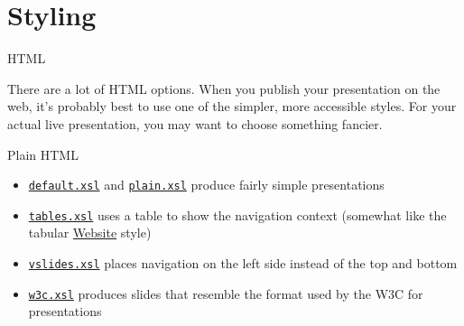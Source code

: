 \documentclass[pdf,frames,slideColor, rcas]{prosper}
\begin{document}
\part{Styling            }
\label{id2719315}


\begin{slide}{HTML}
\label{id2719325}

There are a lot of HTML options. When you publish your
presentation on the web, it's probably best to use one of the simpler,
more accessible styles. For your actual live presentation, you may
want to choose something fancier.
\end{slide}

\begin{slide}{Plain HTML}
\label{id2719340}
\begin{itemize}

	\item 
\href{../default/}{{\tt{default.xsl}}}
and
\href{../plain/}{{\tt{plain.xsl}}}
produce fairly simple presentations



	\item 
\href{../tables/}{{\tt{tables.xsl}}}
uses a table to show the navigation context (somewhat like the tabular
\href{http://docbook.sourceforge.net/}{Website} style)



	\item 
\href{../vslides/}{{\tt{vslides.xsl}}}
places navigation on the left side instead of the top and bottom



	\item 
\href{../w3c/}{{\tt{w3c.xsl}}}
produces slides that resemble the format used by the W3C for presentations


\end{itemize}
\end{slide}
\end{document}
